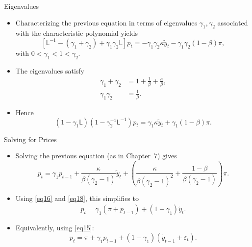 \documentclass[11pt,aspectratio=169]{beamer}
\begin{document}
\begin{frame}{Eigenvalues}
\small
\begin{itemize}
    \item Characterizing the previous equation in terms of eigenvalues \(\gamma_1,\gamma_2\) associated with the characteristic polynomial yields
    \[
    \left[ \mathsf{L}^{-1} - (\gamma_1 + \gamma_2) + \gamma_1 \gamma_2 \mathsf{L} \right] p_t
    = -\gamma_1 \gamma_2 \kappa \tilde{y}_t
    - \gamma_1 \gamma_2 (1 - \beta)\pi,
    \]
    with \(0<\gamma_1<1<\gamma_2\).
    \item The eigenvalues satisfy
    \begin{align}
        \gamma _{1}+\gamma _{2} &=1+\frac{1}{\beta }+\frac{\kappa }{\beta }, 
        \label{eq16} \\
        \gamma _{1}\gamma _{2} &=\frac{1}{\beta }.  \label{eq17}
    \end{align}
    \item Hence
    \[
    (1-\gamma_1\mathsf{L})(1-\gamma_2^{-1}\mathsf{L}^{-1})p_t
    =\gamma_1\kappa \tilde y_t+\gamma_1(1-\beta)\pi.
    \]
\end{itemize}
\end{frame}

\begin{frame}{Solving for Prices}
\small
\begin{itemize}
    \item Solving the previous equation (as in Chapter~7) gives
    \[
    p_t
    = \gamma_1 p_{t-1}
    + \frac{\kappa}{\beta(\gamma_2 - 1)} \tilde{y}_t
    + \left(
        \frac{\kappa}{\beta(\gamma_2 - 1)^2}
        + \frac{1 - \beta}{\beta(\gamma_2 - 1)}
      \right)\pi .
    \]
    \item Using \eqref{eq16} and \eqref{eq18}, this simplifies to
    \begin{align}
        p_{t}=\gamma _{1}(\pi +p_{t-1})+(1-\gamma _{1})\tilde{y}_{t}.
        \label{eq18}
    \end{align}
    \item Equivalently, using \eqref{eq15}:
    \[
    p_t = \pi + \gamma_1 p_{t-1} + (1 - \gamma_1)(\tilde{y}_{t-1} + \varepsilon_t).
    \]
\end{itemize}
\end{frame}

\end{document}

